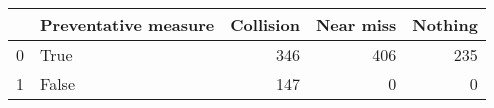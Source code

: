 \begin{tabular}{llrrr}
\toprule
{} &  Preventative measure &  Collision &  Near miss &  Nothing \\
\midrule
0 &                  True &        346 &        406 &      235 \\
1 &                 False &        147 &          0 &        0 \\
\bottomrule
\end{tabular}
